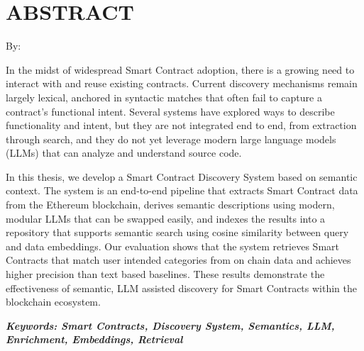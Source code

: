 \clearpage
\chapter*{ABSTRACT}

\begin{center}
	\center
	\begin{singlespace}
		\large\bfseries\MakeUppercase{\thetitle}

		\normalfont\normalsize
		By:

		\bfseries \theauthor
	\end{singlespace}
\end{center}

\begin{singlespace}
	\small

    In the midst of widespread Smart Contract adoption, there is a growing need to interact with and reuse existing contracts. Current discovery mechanisms remain largely lexical, anchored in syntactic matches that often fail to capture a contract's functional intent. Several systems have explored ways to describe functionality and intent, but they are not integrated end to end, from extraction through search, and they do not yet leverage modern large language models (LLMs) that can analyze and understand source code.

	In this thesis, we develop a Smart Contract Discovery System based on semantic context. The system is an end-to-end pipeline that extracts Smart Contract data from the Ethereum blockchain, derives semantic descriptions using modern, modular LLMs that can be swapped easily, and indexes the results into a repository that supports semantic search using cosine similarity between query and data embeddings. Our evaluation shows that the system retrieves Smart Contracts that match user intended categories from on chain data and achieves higher precision than text based baselines. These results demonstrate the effectiveness of semantic, LLM assisted discovery for Smart Contracts within the blockchain ecosystem.

	\textbf{\textit{Keywords: Smart Contracts, Discovery System, Semantics, LLM, Enrichment, Embeddings, Retrieval}}
\end{singlespace}
\clearpage

\clearpage